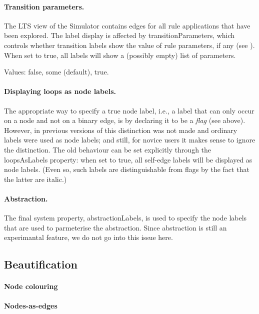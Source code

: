 \paragraph{Transition parameters.}

The LTS view of the Simulator contains edges for all rule applications that
have been explored. The label display is affected by
\textsf{transitionParameters}, which controls whether transition labels show
the value of rule parameters, if any (see ). When set to
\textsf{true}, all labels will show a (possibly empty) list of parameters.

Values: \textsf{false}, \textsf{some} (default), \textsf{true}.

\paragraph{Displaying loops as node labels.}

The appropriate way to specify a true node label, i.e., a label that can only
occur on a node and not on a binary edge, is by declaring it to be a
\emph{flag} (see above). However, in previous versions of \GROOVE this
distinction was not made and ordinary labels were used as node labels; and
still, for novice users it makes sense to ignore the distinction. The old
behaviour can be set explicitly through the \textsf{loopsAsLabels} property:
when set to \textsf{true}, all self-edge labels will be displayed as node
labels. (Even so, such labels are distinguishable from flags by the fact that
the latter are italic.)

\paragraph{Abstraction.}

The final system property, \textsf{abstractionLabels}, is used to specify the
node labels that are used to parmeterise the abstraction. Since abstraction is
still an experimantal feature, we do not go into this issue here.

\subsection{Beautification}

\paragraph{Node colouring}

\paragraph{Nodes-as-edges}
